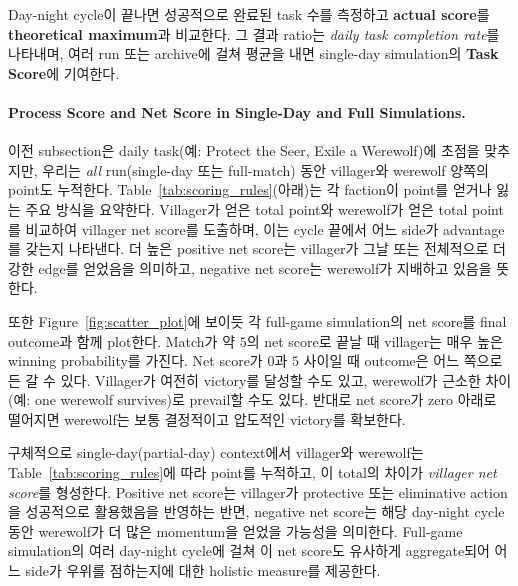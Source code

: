 Day-night cycle이 끝나면 성공적으로 완료된 task 수를 측정하고 \textbf{actual score}를 \textbf{theoretical maximum}과 비교한다. 그 결과 ratio는 \emph{daily task completion rate}를 나타내며, 여러 run 또는 archive에 걸쳐 평균을 내면 single-day simulation의 \textbf{Task Score}에 기여한다.

\paragraph{Process Score and Net Score in Single-Day and Full Simulations.}
이전 subsection은 daily task(예: Protect the Seer, Exile a Werewolf)에 초점을 맞추지만, 우리는 \emph{all} run(single-day 또는 full-match) 동안 villager와 werewolf 양쪽의 point도 누적한다. Table~\ref{tab:scoring_rules}(아래)는 각 faction이 point를 얻거나 잃는 주요 방식을 요약한다. Villager가 얻은 total point와 werewolf가 얻은 total point를 비교하여 villager net score를 도출하며, 이는 cycle 끝에서 어느 side가 advantage를 갖는지 나타낸다. 더 높은 positive net score는 villager가 그날 또는 전체적으로 더 강한 edge를 얻었음을 의미하고, negative net score는 werewolf가 지배하고 있음을 뜻한다.

또한 Figure~\ref{fig:scatter_plot}에 보이듯 각 full-game simulation의 net score를 final outcome과 함께 plot한다. Match가 약 $5$의 net score로 끝날 때 villager는 매우 높은 winning probability를 가진다. Net score가 $0$과 $5$ 사이일 때 outcome은 어느 쪽으로든 갈 수 있다. Villager가 여전히 victory를 달성할 수도 있고, werewolf가 근소한 차이(예: one werewolf survives)로 prevail할 수도 있다. 반대로 net score가 zero 아래로 떨어지면 werewolf는 보통 결정적이고 압도적인 victory를 확보한다.


구체적으로 single-day(partial-day) context에서 villager와 werewolf는 Table~\ref{tab:scoring_rules}에 따라 point를 누적하고, 이 total의 차이가 \emph{villager net score}를 형성한다. Positive net score는 villager가 protective 또는 eliminative action을 성공적으로 활용했음을 반영하는 반면, negative net score는 해당 day-night cycle 동안 werewolf가 더 많은 momentum을 얻었을 가능성을 의미한다. Full-game simulation의 여러 day-night cycle에 걸쳐 이 net score도 유사하게 aggregate되어 어느 side가 우위를 점하는지에 대한 holistic measure를 제공한다.

